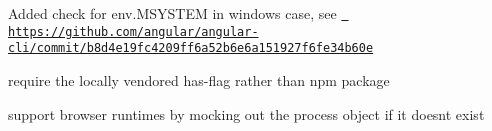 
\begin{DoxyItemize}
\item Added check for {\ttfamily env.\+MSYSTEM} in windows case, see \href{https://github.com/angular/angular-cli/commit/b8d4e19fc4209ff6a52b6e6a151927f6fe34b60e}{\texttt{ https\+://github.\+com/angular/angular-\/cli/commit/b8d4e19fc4209ff6a52b6e6a151927f6fe34b60e}}
\end{DoxyItemize}

require the locally vendored has-\/flag rather than npm package
\begin{DoxyItemize}
\item support browser runtimes by mocking out the process object if it doesn\textquotesingle{}t exist 
\end{DoxyItemize}